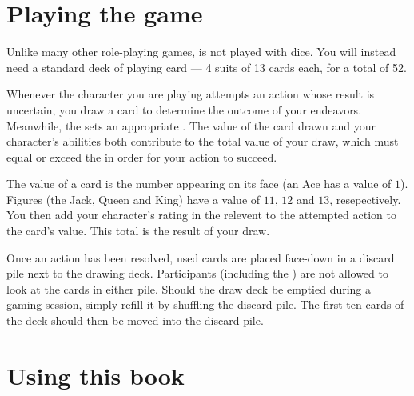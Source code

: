 \section{Playing the game}

Unlike many other role-playing games, \ParadoxSpaceRPG{} is not played with dice.
You will instead need a standard deck of playing card --- 4 suits of 13 cards each, for a total of 52.

Whenever the character you are playing attempts an action whose result is uncertain, you draw a card to
determine the outcome of your endeavors. Meanwhile, the \GM sets an appropriate \TN.
The value of the card drawn and your character's abilities both contribute to the total value of your
draw, which must equal or exceed the \TN in order for your action to succeed.

The value of a card is the number appearing on its face (an Ace has a value of $1$). Figures (the Jack, Queen
and King) have a value of $11$, $12$ and $13$, resepectively. You then add your character's rating in the
 relevent to the attempted action to the card's value. This total is the result of your
draw.

Once an action has been resolved, used cards are placed face-down in a discard pile next to the drawing deck.
Participants (including the \GM) are not allowed to look at the cards in either pile.
Should the draw deck be emptied during a gaming session, simply refill it by shuffling the discard pile.
The first ten cards of the deck should then be moved into the discard pile.

\section{Using this book}
